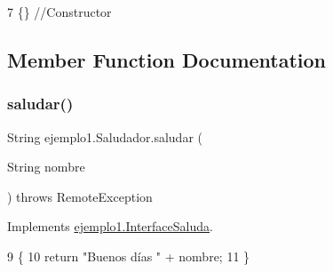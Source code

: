 \begin{DoxyCode}
7 \{\}                 \textcolor{comment}{//Constructor}
\end{DoxyCode}


\subsection{Member Function Documentation}
\mbox{\label{classejemplo1_1_1_saludador_accec00f9fe8215cabc7a9a8c8016c538}} 
\subsubsection{\texorpdfstring{saludar()}{saludar()}}
{\footnotesize\ttfamily String ejemplo1.\+Saludador.\+saludar (\begin{DoxyParamCaption}\item[{String}]{nombre }\end{DoxyParamCaption}) throws Remote\+Exception\hspace{0.3cm}{\ttfamily [inline]}}



Implements \mbox{\hyperlink{interfaceejemplo1_1_1_interface_saluda_a78bdbef5411444fbb2525f2862a29eff}{ejemplo1.\+Interface\+Saluda}}.


\begin{DoxyCode}
9     \{   
10         \textcolor{keywordflow}{return} \textcolor{stringliteral}{"Buenos días "} + nombre;
11     \}
\end{DoxyCode}
